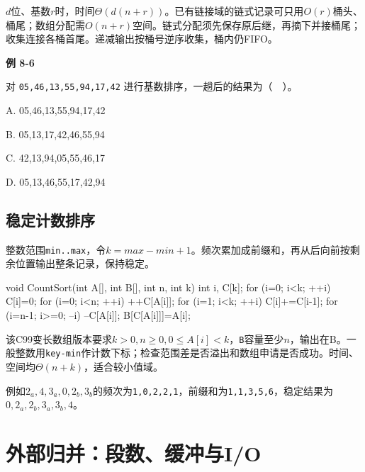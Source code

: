 \(d\)位、基数\(r\)时，时间\(\Theta(d(n+r))\)。已有链接域的链式记录可只用\(O(r)\)桶头、桶尾；数组分配需\(O(n+r)\)空间。链式分配须先保存原后继，再摘下并接桶尾；收集连接各桶首尾。递减输出按桶号逆序收集，桶内仍FIFO。

\par\medskip{}\noindent\hypertarget{DS08-E05}{}\label{DS08-E05}\textbf{例 8-6}\par\nobreak\smallskip

对 \texttt{05,\allowbreak{}46,\allowbreak{}13,\allowbreak{}55,\allowbreak{}94,\allowbreak{}17,\allowbreak{}42} 进行基数排序，一趟后的结果为（　）。

A. 05,46,13,55,94,17,42

B. 05,13,17,42,46,55,94

C. 42,13,94,05,55,46,17

D. 05,13,46,55,17,42,94

\subsection{稳定计数排序}\label{DS08-counting}

整数范围\texttt{min.\allowbreak{}.\allowbreak{}max}，令\(k=max-min+1\)。频次累加成前缀和，再从后向前按剩余位置输出整条记录，保持稳定。

\par\smallskip\noindent\begin{minipage}{\linewidth}
\begin{codeblock}[language={C}]
void CountSort(int A[], int B[], int n, int k) {
    int i, C[k];
    for (i=0; i<k; ++i) C[i]=0;
    for (i=0; i<n; ++i) ++C[A[i]];
    for (i=1; i<k; ++i) C[i]+=C[i-1];
    for (i=n-1; i>=0; --i) {
        --C[A[i]];
        B[C[A[i]]]=A[i];
    }
}
\end{codeblock}
\end{minipage}\par\smallskip

该C99变长数组版本要求\(k>0,n\ge0,0\le A[i]<k\)，\texttt{B}容量至少\(n\)，输出在B。一般整数用\texttt{key-min}作计数下标；检查范围差是否溢出和数组申请是否成功。时间、空间均\(\Theta(n+k)\)，适合较小值域。

例如\(2_a,4,3_a,0,2_b,3_b\)的频次为\texttt{1,\allowbreak{}0,\allowbreak{}2,\allowbreak{}2,\allowbreak{}1}，前缀和为\texttt{1,\allowbreak{}1,\allowbreak{}3,\allowbreak{}5,\allowbreak{}6}，稳定结果为\(0,2_a,2_b,3_a,3_b,4\)。

\section{外部归并：段数、缓冲与I/O}\label{DS08-external}

